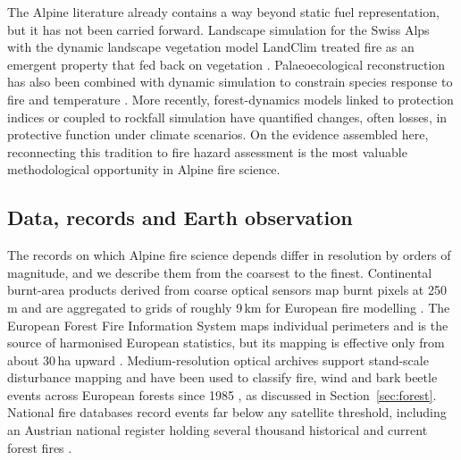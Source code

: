 \documentclass[11pt,a4paper]{article}
\begin{document}
The Alpine literature already contains a way beyond static fuel representation, but it has not been carried forward. Landscape simulation for the Swiss Alps with the dynamic landscape vegetation model LandClim treated fire as an emergent property that fed back on vegetation \citep{schumacher_relative_2006, colombaroli_species_2010}. Palaeoecological reconstruction has also been combined with dynamic simulation to constrain species response to fire and temperature \citep{colombaroli_species_2010}. More recently, forest-dynamics models linked to protection indices \citep{hillebrand_contrasting_2023} or coupled to rockfall simulation \citep{moos_climate_2021} have quantified changes, often losses, in protective function under climate scenarios. On the evidence assembled here, reconnecting this tradition to fire hazard assessment is the most valuable methodological opportunity in Alpine fire science.

\subsection{Data, records and Earth observation}
\label{sec:data}

The records on which Alpine fire science depends differ in resolution by orders of magnitude, and we describe them from the coarsest to the finest. Continental burnt-area products derived from coarse optical sensors map burnt pixels at 250\,m and are aggregated to grids of roughly 9\,km for European fire modelling \citep{forrest_understanding_2024}. The European Forest Fire Information System maps individual perimeters and is the source of harmonised European statistics, but its mapping is effective only from about 30\,ha upward \citep{beloiu_climatedriven_2026}. Medium-resolution optical archives support stand-scale disturbance mapping and have been used to classify fire, wind and bark beetle events across European forests since 1985 \citep{miguel_unravelling_2026}, as discussed in Section~\ref{sec:forest}. National fire databases record events far below any satellite threshold, including an Austrian national register holding several thousand historical and current forest fires \citep{papathomakohle_towards_2025}.
\end{document}
